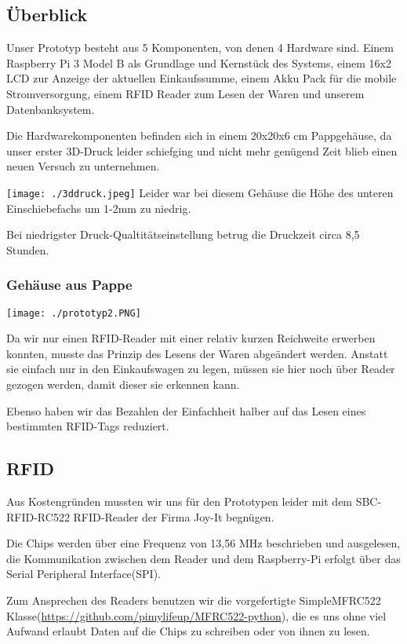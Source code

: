 \documentclass{sigchi}
\begin{document}
\subsection{Überblick}
Unser Prototyp besteht aus 5 Komponenten, von denen 4 Hardware sind. Einem Raspberry Pi 3 Model B als Grundlage und Kernstück des Systems, einem 16x2 LCD zur Anzeige der aktuellen Einkaufssumme, einem Akku Pack für die mobile Stromversorgung, einem RFID Reader zum Lesen der Waren und unserem Datenbanksystem.

Die Hardwarekomponenten befinden sich in einem 20x20x6 cm Pappgehäuse, da unser erster 3D-Druck leider schiefging und nicht mehr genügend Zeit blieb einen neuen Versuch zu unternehmen.


\texttt{[image: ./3ddruck.jpeg]}
Leider war bei diesem Gehäuse die Höhe des unteren Einschiebefachs um 1-2mm zu niedrig.

Bei niedrigster Druck-Qualtitätseinstellung betrug die Druckzeit circa 8,5 Stunden.

\subsubsection{Gehäuse aus Pappe}
\texttt{[image: ./prototyp2.PNG]}

Da wir nur einen RFID-Reader mit einer relativ kurzen Reichweite erwerben konnten, musste das Prinzip des Lesens der Waren abgeändert werden. Anstatt sie einfach nur in den Einkaufswagen zu legen, müssen sie hier noch über Reader gezogen werden, damit dieser sie erkennen kann.

Ebenso haben wir das Bezahlen der Einfachheit halber auf das Lesen eines bestimmten RFID-Tags reduziert.



\subsection{RFID}
Aus Kostengründen mussten wir uns für den Prototypen leider mit dem SBC-RFID-RC522 RFID-Reader der Firma Joy-It begnügen. 

Die Chips werden über eine Frequenz von 13,56 MHz beschrieben und ausgelesen, die Kommunikation zwischen dem Reader und dem Raspberry-Pi erfolgt über das Serial Peripheral Interface(SPI).

Zum Ansprechen des Readers benutzen wir die vorgefertigte SimpleMFRC522 Klasse(\url{https://github.com/pimylifeup/MFRC522-python}), die es uns ohne viel Aufwand erlaubt Daten auf die Chips zu schreiben oder von ihnen zu lesen.
\end{document}
